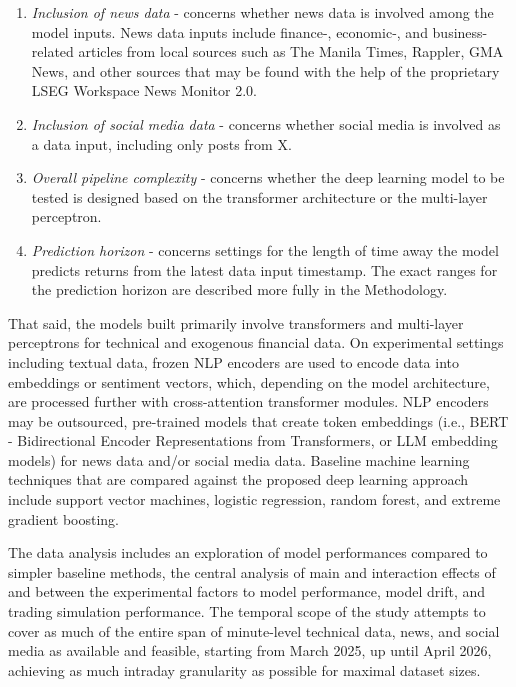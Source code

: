 \documentclass[stu,floatsintext]{apa7}
\begin{document}
\begin{enumerate}
\item \textit{Inclusion of news data} - concerns whether news data is involved among the model inputs. News data inputs include finance-, economic-, and business-related articles from local sources such as The Manila Times, Rappler, GMA News, and other sources that may be found with the help of the proprietary LSEG Workspace News Monitor 2.0.
\item \textit{Inclusion of social media data} - concerns whether social media is involved as a data input, including only posts from X.
\item \textit{Overall pipeline complexity} - concerns whether the deep learning model to be tested is designed based on the transformer architecture or the multi-layer perceptron.
\item \textit{Prediction horizon} - concerns settings for the length of time away the model predicts returns from the latest data input timestamp. The exact ranges for the prediction horizon are described more fully in the Methodology.
\end{enumerate}

That said, the models built primarily involve transformers and multi-layer perceptrons for technical and exogenous financial data. On experimental settings including textual data, frozen NLP encoders are used to encode data into embeddings or sentiment vectors, which, depending on the model architecture, are processed further with cross-attention transformer modules. NLP encoders may be outsourced, pre-trained models that create token embeddings (i.e., BERT - Bidirectional Encoder Representations from Transformers, or LLM embedding models) for news data and/or social media data. Baseline machine learning techniques that are compared against the proposed deep learning approach include support vector machines, logistic regression, random forest, and extreme gradient boosting.

The data analysis includes an exploration of model performances compared to simpler baseline methods, the central analysis of main and interaction effects of and between the experimental factors to model performance, model drift, and trading simulation performance. The temporal scope of the study attempts to cover as much of the entire span of minute-level technical data, news, and social media as available and feasible, starting from March 2025, up until April 2026, achieving as much intraday granularity as possible for maximal dataset sizes.
\end{document}

